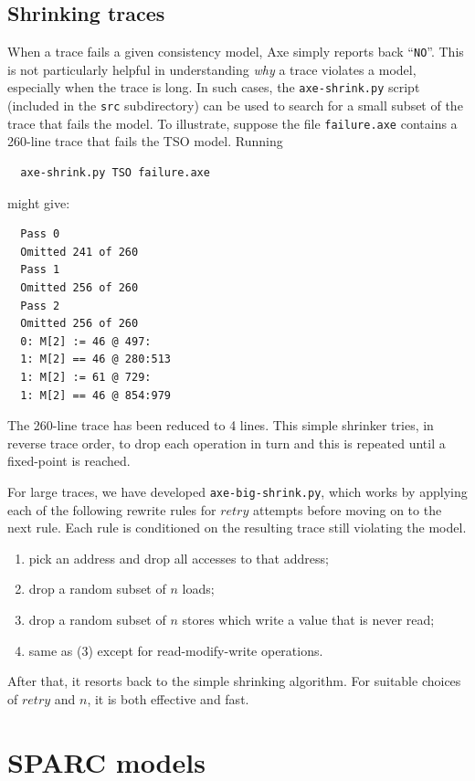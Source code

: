 \documentclass[11pt]{article}
\begin{document}
\subsection*{Shrinking traces}

When a trace fails a given consistency model, Axe
simply reports back ``\verb!NO!''.  This is not particularly helpful
in understanding \emph{why} a trace violates a model,
especially when the trace is
long.  In such cases, the \verb!axe-shrink.py! script
(included in the \verb!src! subdirectory) can be used to search for a
small subset of the trace that fails the model.
To illustrate, suppose the file \verb!failure.axe! contains a 260-line
trace that fails the TSO model.  Running
\begin{verbatim}
  axe-shrink.py TSO failure.axe
\end{verbatim}
might give:
\begin{verbatim}
  Pass 0
  Omitted 241 of 260         
  Pass 1
  Omitted 256 of 260         
  Pass 2
  Omitted 256 of 260         
  0: M[2] := 46 @ 497:
  1: M[2] == 46 @ 280:513
  1: M[2] := 61 @ 729:
  1: M[2] == 46 @ 854:979
\end{verbatim}

\noindent The 260-line trace has been reduced to 4 lines.  This simple
shrinker tries, in reverse trace order, to drop each operation in turn
and this is repeated until a fixed-point is reached.

For large traces, we have developed \verb!axe-big-shrink.py!, which
works by applying each of the following rewrite rules for $retry$
attempts before moving on to the next rule.  Each rule is conditioned
on the resulting trace still violating the model.

\begin{enumerate}
\item pick an address and drop all accesses to that address;
\item drop a random subset of $n$ loads;
\item drop a random subset of $n$ stores which write
a value that is never read;
\item same as (3) except for read-modify-write operations.
\end{enumerate}

\noindent After that, it resorts back to the simple shrinking
algorithm.  For suitable choices of $retry$ and $n$, it is both
effective and fast.

\section{SPARC models}
\label{Section:SPARCModels}
\end{document}
